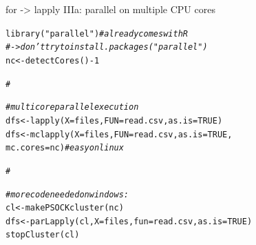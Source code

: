 \documentclass[xcolor=table,       handout,    xcolor=dvipsnames]{beamer}\usepackage[]{graphicx}\usepackage[]{color}
\makeatletter
\newcommand{\hlnum}[1]{\textcolor[rgb]{0,0,0}{#1}}
\newcommand{\hlstr}[1]{\textcolor[rgb]{0.545,0.137,0.137}{#1}}
\newcommand{\hlcom}[1]{\textcolor[rgb]{0,0.392,0}{\textit{#1}}}
\newcommand{\hlopt}[1]{\textcolor[rgb]{0,0,0}{#1}}
\newcommand{\hlstd}[1]{\textcolor[rgb]{0,0,0}{#1}}
\newcommand{\hlkwb}[1]{\textcolor[rgb]{0,0,0}{#1}}
\newcommand{\hlkwc}[1]{\textcolor[rgb]{1,0,1}{#1}}
\newcommand{\hlkwd}[1]{\textcolor[rgb]{0,0,1}{#1}}
\newenvironment{kframe}{%
 \def\at@end@of@kframe{}%
 \ifinner\ifhmode%
  \def\at@end@of@kframe{\end{minipage}}%
  \begin{minipage}{\columnwidth}%
 \fi\fi%
 \def\FrameCommand##1{\hskip\@totalleftmargin \hskip-\fboxsep
 \colorbox{shadecolor}{##1}\hskip-\fboxsep
     \hskip-\linewidth \hskip-\@totalleftmargin \hskip\columnwidth}%
 \MakeFramed {\advance\hsize-\width
   \@totalleftmargin\z@ \linewidth\hsize
   \@setminipage}}%
 {\par\unskip\endMakeFramed%
 \at@end@of@kframe}
\newenvironment{knitrout}{}{} %
\makeatother
\begin{document}

\begin{frame}[fragile]{for -> lapply IIIa: parallel on multiple CPU cores}
\vspace{-1em}
\begin{knitrout}
\color{fgcolor}\begin{kframe}
\begin{alltt}
\hlkwd{library}\hlstd{(}\hlstr{"parallel"}\hlstd{)} \hlcom{# already comes with R }
\hlcom{# -> don't try to  install.packages("parallel")}
\hlstd{nc} \hlkwb{<-} \hlkwd{detectCores}\hlstd{()}\hlopt{-}\hlnum{1}

\hlcom{#}
\end{alltt}
\end{kframe}
\end{knitrout}
\pause \vspace{-2.6em}
\begin{knitrout}
\color{fgcolor}\begin{kframe}
\begin{alltt}
\hlcom{# multicore parallel execution}
\hlstd{dfs} \hlkwb{<-}        \hlkwd{lapply}\hlstd{(}\hlkwc{X}\hlstd{=files,} \hlkwc{FUN}\hlstd{=read.csv,} \hlkwc{as.is}\hlstd{=}\hlnum{TRUE}\hlstd{)}
\hlstd{dfs} \hlkwb{<-}      \hlkwd{mclapply}\hlstd{(}\hlkwc{X}\hlstd{=files,} \hlkwc{FUN}\hlstd{=read.csv,} \hlkwc{as.is}\hlstd{=}\hlnum{TRUE}\hlstd{,}
                     \hlkwc{mc.cores}\hlstd{=nc)} \hlcom{# easy on linux}

\hlcom{#}
\end{alltt}
\end{kframe}
\end{knitrout}
\pause \vspace{-2.6em}
\begin{knitrout}
\color{fgcolor}\begin{kframe}
\begin{alltt}
\hlcom{# more code needed on windows:}
\hlstd{cl} \hlkwb{<-} \hlkwd{makePSOCKcluster}\hlstd{(nc)}
\hlstd{dfs} \hlkwb{<-} \hlkwd{parLapply}\hlstd{(cl,} \hlkwc{X}\hlstd{=files,} \hlkwc{fun}\hlstd{=read.csv,} \hlkwc{as.is}\hlstd{=}\hlnum{TRUE}\hlstd{)}
\hlkwd{stopCluster}\hlstd{(cl)}


\end{alltt}
\end{kframe}
\end{knitrout}
\end{frame}
\end{document}
